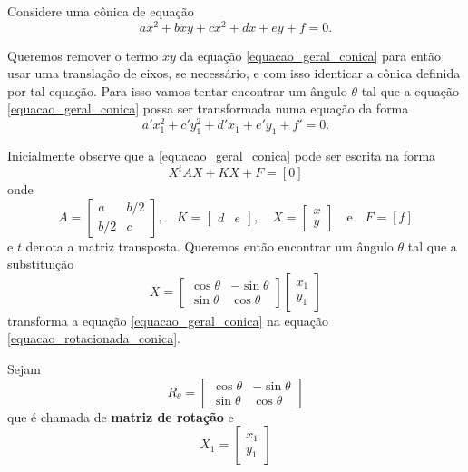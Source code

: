 Considere uma cônica de equação
\begin{equation}\label{equacao_geral_conica}
  ax^2 + bxy + cx^2 + dx + ey + f = 0.
\end{equation}

Queremos remover o termo $xy$ da equação \eqref{equacao_geral_conica} para então usar uma translação de eixos, se necessário, e com isso identicar a cônica definida por tal equação. Para isso vamos tentar encontrar um ângulo $\theta$ tal que a equação \eqref{equacao_geral_conica} possa ser transformada numa equação da forma
\begin{equation}\label{equacao_rotacionada_conica}
  a'x_1^2 + c'y_1^2 + d'x_1 + e'y_1 + f' = 0.
\end{equation}

Inicialmente observe que a \eqref{equacao_geral_conica} pode ser escrita na forma
\begin{equation}\label{equacao_matricial_conica}
  X^tAX + KX + F = [0]
\end{equation}
onde
\[
  A = \begin{bmatrix}
    a & b/2\\
    b/2 & c
  \end{bmatrix}
, \quad K = \begin{bmatrix}
  d & e
\end{bmatrix}, \quad X = \begin{bmatrix}
  x\\
  y
\end{bmatrix}\quad\mbox{e}\quad F = [f]
\]
e $t$ denota a matriz transposta. Queremos então encontrar um ângulo $\theta$ tal que a substituição
\begin{equation}\label{substituicao_rotacao_eixos}
  X = \begin{bmatrix}
    \cos\theta & -\sin\theta\\
    \sin\theta & \cos\theta
  \end{bmatrix}\begin{bmatrix}
    x_1\\y_1
  \end{bmatrix}
\end{equation}
transforma a equação \eqref{equacao_geral_conica} na equação \eqref{equacao_rotacionada_conica}.

Sejam
\[
  R_\theta = \begin{bmatrix}
    \cos\theta & -\sin\theta\\
    \sin\theta & \cos\theta
  \end{bmatrix}
\]
que é chamada de \textbf{matriz de rotação} e
\[
  X_1 = \begin{bmatrix}x_1\\y_1\end{bmatrix}
\]



